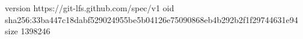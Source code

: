 version https://git-lfs.github.com/spec/v1
oid sha256:33ba447c18dabf529024955be5b04126e75090868eb4b292b2f1f29744631e94
size 1398246
